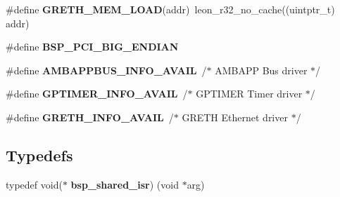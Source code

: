 \begin{DoxyCompactItemize}
\#define {\bfseries G\+R\+E\+T\+H\+\_\+\+M\+E\+M\+\_\+\+L\+O\+AD}(addr)~leon\+\_\+r32\+\_\+no\+\_\+cache((uintptr\+\_\+t) addr)
\item 
\mbox{\label{group__RTEMSBSPsSPARCLEON2_ga662889d4bf7d024ef4d07f7a747018d2}} 
\#define {\bfseries B\+S\+P\+\_\+\+P\+C\+I\+\_\+\+B\+I\+G\+\_\+\+E\+N\+D\+I\+AN}
\item 
\mbox{\label{group__RTEMSBSPsSPARCLEON2_ga315fb25d575c3e032fd22487e3ae9663}} 
\#define {\bfseries A\+M\+B\+A\+P\+P\+B\+U\+S\+\_\+\+I\+N\+F\+O\+\_\+\+A\+V\+A\+IL}~/$\ast$ A\+M\+B\+A\+PP Bus driver $\ast$/
\item 
\mbox{\label{group__RTEMSBSPsSPARCLEON2_ga7e2a6d4e9669c475b2d90952d8860764}} 
\#define {\bfseries G\+P\+T\+I\+M\+E\+R\+\_\+\+I\+N\+F\+O\+\_\+\+A\+V\+A\+IL}~/$\ast$ G\+P\+T\+I\+M\+ER Timer driver $\ast$/
\item 
\mbox{\label{group__RTEMSBSPsSPARCLEON2_ga118faf137e751f44e394972e73a8cacb}} 
\#define {\bfseries G\+R\+E\+T\+H\+\_\+\+I\+N\+F\+O\+\_\+\+A\+V\+A\+IL}~/$\ast$ G\+R\+E\+TH Ethernet driver $\ast$/
\end{DoxyCompactItemize}
\subsection*{Typedefs}
\begin{DoxyCompactItemize}
\item 
\mbox{\label{group__RTEMSBSPsSPARCLEON2_ga5ab827b319fd4d84eebf884a6e2b6a24}} 
typedef void($\ast$ {\bfseries bsp\+\_\+shared\+\_\+isr}) (void $\ast$arg)
\end{DoxyCompactItemize}
